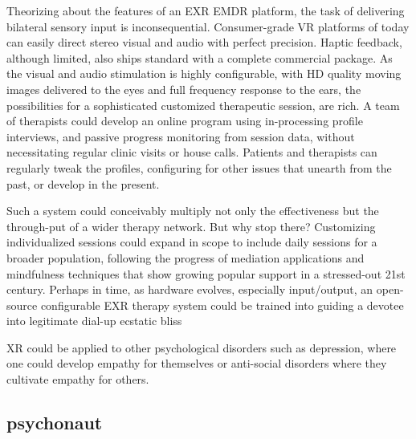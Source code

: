 \documentclass{UIdahoMastersThesis}
\begin{document}
Theorizing about the features of an EXR EMDR platform, the task of delivering bilateral sensory input is inconsequential. Consumer-grade VR platforms of today can easily direct stereo visual and audio with perfect precision. Haptic feedback, although limited, also ships standard with a complete commercial package. As the visual and audio stimulation is highly configurable, with HD quality moving images delivered to the eyes and full frequency response to the ears, the possibilities for a sophisticated customized therapeutic session, are rich. A team of therapists could develop an online program using in-processing profile interviews, and passive progress monitoring from session data, without necessitating regular clinic visits or house calls. Patients and therapists can regularly tweak the profiles, configuring for other issues that unearth from the past, or develop in the present.

Such a system could conceivably multiply not only the effectiveness but the through-put of a wider therapy network. But why stop there? Customizing individualized sessions could expand in scope to include daily sessions for a broader population, following the progress of mediation applications and mindfulness techniques that show growing popular support in a stressed-out 21st century. Perhaps in time, as hardware evolves, especially input/output, an open-source configurable EXR therapy system could be trained into guiding a devotee into legitimate dial-up ecstatic bliss

XR could be applied to other psychological disorders such as depression, where one could develop empathy for themselves or anti-social disorders where they cultivate empathy for others.

\subsection{psychonaut}
\end{document}
